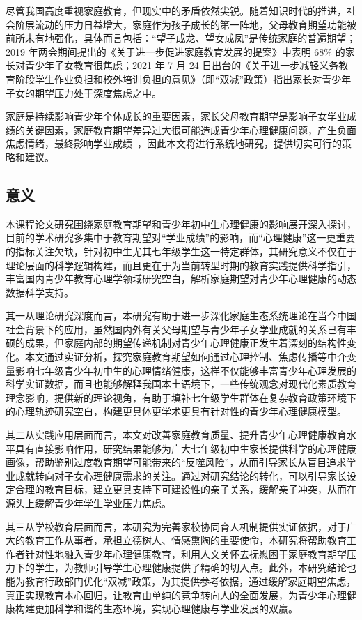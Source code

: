 \documentclass[zihao = -4, linespread = 1.5]{article}
\begin{document}
尽管我国高度重视家庭教育，但现实中的矛盾依然尖锐。随着知识时代的推进，社会阶层流动的压力日益增大，家庭作为孩子成长的第一阵地，父母教育期望功能被前所未有地强化，具体而言包括：“望子成龙、望女成凤”是传统家庭的普遍期望；2019 年两会期间提出的《关于进一步促进家庭教育发展的提案》中表明 68\% 的家长对青少年子女教育很焦虑；2021 年 7 月 24 日出台的《关于进一步减轻义务教育阶段学生作业负担和校外培训负担的意见》（即“双减”政策）指出家长对青少年子女的期望压力处于深度焦虑之中。

家庭是持续影响青少年个体成长的重要因素，家长父母教育期望是影响子女学业成绩的关键因素，家庭教育期望差异过大很可能造成青少年心理健康问题，产生负面焦虑情绪，最终影响学业成绩~\citep{WangYaNan}，因此本文将进行系统地研究，提供切实可行的策略和建议。



\subsection{意义}
本课程论文研究围绕家庭教育期望和青少年初中生心理健康的影响展开深入探讨，目前的学术研究多集中于教育期望对“学业成绩”的影响，而“心理健康”这一更重要的指标关注欠缺，针对初中生尤其七年级学生这一特定群体，其研究意义不仅在于理论层面的科学逻辑构建，而且更在于为当前转型时期的教育实践提供科学指引，丰富国内青少年教育心理学领域研究空白，解析家庭期望对青少年心理健康的动态数据科学支持。

其一从理论研究深度而言，本研究有助于进一步深化家庭生态系统理论在当今中国社会背景下的应用，虽然国内外有关父母期望与青少年子女学业成就的关系已有丰硕的成果，但家庭内部的期望传递机制对青少年心理健康正发生着深刻的结构性变化。本文通过实证分析，探究家庭教育期望如何通过心理控制、焦虑传播等中介变量影响七年级青少年初中生的心理情绪健康，这样不仅能够丰富青少年心理发展的科学实证数据，而且也能够解释我国本土语境下，一些传统观念对现代化素质教育理念影响，提供新的理论视角，有助于填补七年级学生群体在复杂教育政策环境下的心理轨迹研究空白，构建更具体更学术更具有针对性的青少年心理健康模型。

其二从实践应用层面而言，本文对改善家庭教育质量、提升青少年心理健康教育水平具有直接影响作用，研究结果能够为广大七年级初中生家长提供科学的心理健康画像，帮助鉴别过度教育期望可能带来的“反噬风险”，从而引导家长从盲目追求学业成就转向对子女心理健康需求的关注。通过对研究结论的转化，可以引导家长设定合理的教育目标，建立更具支持下可建设性的亲子关系，缓解亲子冲突，从而在源头上缓解青少年学生学业压力焦虑。

其三从学校教育层面而言，本研究为完善家校协同育人机制提供实证依据，对于广大的教育工作从事者，承担立德树人、情感熏陶的重要使命，本研究将帮助教育工作者针对性地融入青少年心理健康教育，利用人文关怀去抚慰困于家庭教育期望压力下的学生，为教师引导学生心理健康提供了精确的切入点。此外，本研究结论也能为教育行政部门优化“双减”政策，为其提供参考依据，通过缓解家庭期望焦虑，真正实现教育本心回归，让教育由单纯的竞争转向人的全面发展，为青少年心理健康构建更加科学和谐的生态环境，实现心理健康与学业发展的双赢。
\end{document}

